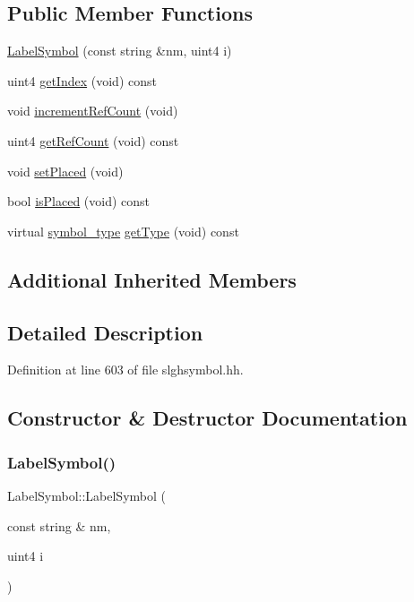 \subsection*{Public Member Functions}
\begin{DoxyCompactItemize}
\item 
\mbox{\hyperlink{class_label_symbol_a8f0be61f08c7e3ca5292203d782b62fa}{Label\+Symbol}} (const string \&nm, uint4 i)
\item 
uint4 \mbox{\hyperlink{class_label_symbol_afd1c15a0468bfa3bfa0ae7ab018edfd6}{get\+Index}} (void) const
\item 
void \mbox{\hyperlink{class_label_symbol_a2183bca5aed7e7dffc74a0e3538e5093}{increment\+Ref\+Count}} (void)
\item 
uint4 \mbox{\hyperlink{class_label_symbol_a2a62ef1da181d35ab9785a493a242a23}{get\+Ref\+Count}} (void) const
\item 
void \mbox{\hyperlink{class_label_symbol_a6be77e18884bf3ea29fb6b214dc5d1e5}{set\+Placed}} (void)
\item 
bool \mbox{\hyperlink{class_label_symbol_a064baae89f74e0b4b3bafa3681fefedc}{is\+Placed}} (void) const
\item 
virtual \mbox{\hyperlink{class_sleigh_symbol_aba70f7f332fd63488c5ec4bd7807db41}{symbol\+\_\+type}} \mbox{\hyperlink{class_label_symbol_ab26e2c5bd5b9c241f7a08d725bd367f7}{get\+Type}} (void) const
\end{DoxyCompactItemize}
\subsection*{Additional Inherited Members}


\subsection{Detailed Description}


Definition at line 603 of file slghsymbol.\+hh.



\subsection{Constructor \& Destructor Documentation}
\mbox{\label{class_label_symbol_a8f0be61f08c7e3ca5292203d782b62fa}} 
\subsubsection{\texorpdfstring{LabelSymbol()}{LabelSymbol()}}
{\footnotesize\ttfamily Label\+Symbol\+::\+Label\+Symbol (\begin{DoxyParamCaption}\item[{const string \&}]{nm,  }\item[{uint4}]{i }\end{DoxyParamCaption})\hspace{0.3cm}{\ttfamily [inline]}}



